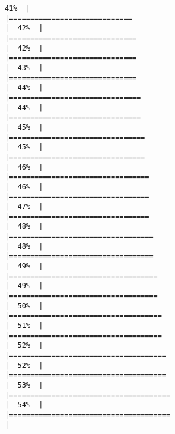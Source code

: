 \documentclass[
]{book}
\begin{document}
\begin{verbatim}
41%  |                                                                              |=============================                                         |  42%  |                                                                              |==============================                                        |  42%  |                                                                              |==============================                                        |  43%  |                                                                              |==============================                                        |  44%  |                                                                              |===============================                                       |  44%  |                                                                              |===============================                                       |  45%  |                                                                              |================================                                      |  45%  |                                                                              |================================                                      |  46%  |                                                                              |=================================                                     |  46%  |                                                                              |=================================                                     |  47%  |                                                                              |=================================                                     |  48%  |                                                                              |==================================                                    |  48%  |                                                                              |==================================                                    |  49%  |                                                                              |===================================                                   |  49%  |                                                                              |===================================                                   |  50%  |                                                                              |====================================                                  |  51%  |                                                                              |====================================                                  |  52%  |                                                                              |=====================================                                 |  52%  |                                                                              |=====================================                                 |  53%  |                                                                              |======================================                                |  54%  |                                                                              |======================================                                |  
\end{verbatim}
\end{document}
